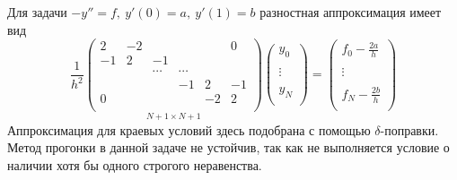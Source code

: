 \begin{example}
  Для задачи $-y''=f,\ y'(0)=a,\ y'(1)=b$ разностная аппроксимация имеет вид
  \[\frac{1}{h^2}\underset{N+1\times N+1}{\left(\begin{array}{cccccc}
        2  & -2 &        &        &    & 0  \\
        -1 & 2  & -1     &        &    &    \\
           &    & \cdots & \cdots &    &    \\
           &    &        & -1     & 2  & -1 \\
        0  &    &        &        & -2 & 2  \\
      \end{array}\right)}
    \left(\begin{array}{c}
        y_{0}  \\
        \\
        \vdots \\
        \\
        y_{N}  \\
      \end{array}\right)
    =\left(\begin{array}{c}
        f_{0} -\frac{2a}{h} \\
        \\
        \vdots              \\
        \\
        f_{N} -\frac{2b}{h} \\
      \end{array}\right)
  \]
  Аппроксимация для краевых условий здесь подобрана с помощью $\delta$-поправки.
  Метод прогонки в данной задаче не устойчив, так как не выполняется условие
  о наличии хотя бы одного строгого неравенства.
\end{example}
